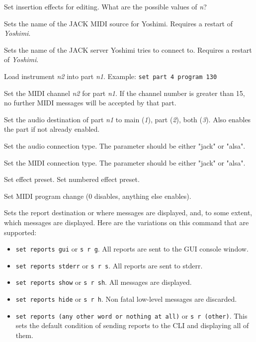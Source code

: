       Set insertion effects for editing.
      What are the possible values of \textsl{n}?

      Sets the name of the JACK MIDI source for Yoshimi.
      Requires a restart of \textsl{Yoshimi}.

      Sets the name of the JACK server Yoshimi tries to connect to.
      Requires a restart of \textsl{Yoshimi}.

      Load instrument \textsl{n2} into part \textsl{n1}.
      Example: \texttt{set part 4 program 130}

      Set the MIDI channel \textsl{n2} for part \textsl{n1}.
      If the channel number is greater than 15, no further MIDI
      messages will be accepted by that part.

      Set the audio destination of part \textsl{n1}
      to main (\textsl{1}), part (\textsl{2}), both (\textsl{3}).
      Also enables the part if not already enabled.

      Set the audio connection type.
      The parameter should be either "jack" or "alsa".

      Set the MIDI connection type.
      The parameter should be either "jack" or "alsa".

      Set effect preset.
      Set numbered effect preset.

      Set MIDI program change (0 disables, anything else enables).

      Sets the report destination or where messages are displayed, and, to some
      extent, which messages are displayed.  Here are the variations on this
      command that are supported:

      \begin{itemize}
         \item \texttt{set reports gui} or \texttt{s r g}.
            All reports are sent to the GUI console window.
         \item \texttt{set reports stderr} or \texttt{s r s}.
            All reports are sent to stderr.
         \item \texttt{set reports show} or \texttt{s r sh}.
            All messages are displayed.
         \item \texttt{set reports hide} or \texttt{s r h}.
            Non fatal low-level messages are discarded.
         \item \texttt{set reports (any other word or nothing at all)} or
            \texttt{s r (other)}.
            This sets the default condition of sending reports to the CLI and
            displaying all of them.
      \end{itemize}

